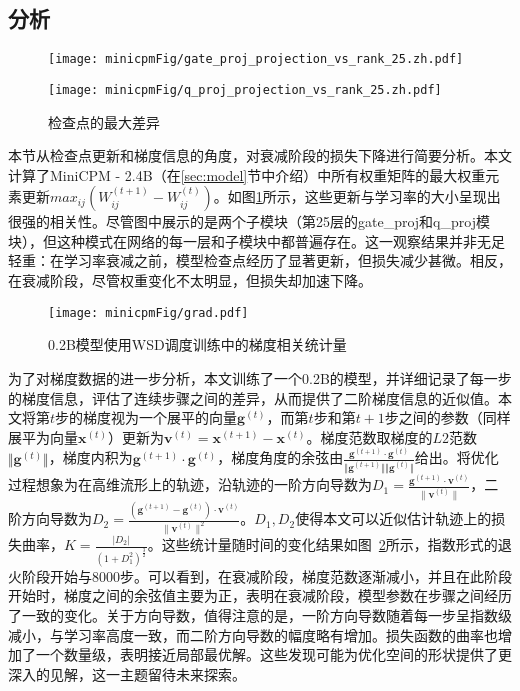 \subsection{分析}
\begin{figure}[htbp]
    \centering
    \begin{minipage}[b]{0.8\linewidth}
        \centering
        \texttt{[image: minicpmFig/gate\_proj\_projection\_vs\_rank\_25.zh.pdf]}
    \end{minipage}
    \vspace{0.5cm} %
    \begin{minipage}[b]{0.8\linewidth}
        \centering
        \texttt{[image: minicpmFig/q\_proj\_projection\_vs\_rank\_25.zh.pdf]}
    \end{minipage}
    \caption{检查点的最大差异}
    \label{fig:appmaxdiff}
\end{figure}
本节从检查点更新和梯度信息的角度，对衰减阶段的损失下降进行简要分析。本文计算了MiniCPM - 2.4B（在\ref{sec:model}节中介绍）中所有权重矩阵的最大权重元素更新$max_{ij} (W_{ij}^{(t + 1)} - W_{ij}^{(t)})$。如图\ref{fig:appmaxdiff}所示，这些更新与学习率的大小呈现出很强的相关性。尽管图中展示的是两个子模块（第25层的gate\_proj和q\_proj模块），但这种模式在网络的每一层和子模块中都普遍存在。这一观察结果并非无足轻重：在学习率衰减之前，模型检查点经历了显著更新，但损失减少甚微。相反，在衰减阶段，尽管权重变化不太明显，但损失却加速下降。  




\begin{figure}[htbp]
    \centering
        \centering
        \texttt{[image: minicpmFig/grad.pdf]}
     \caption{0.2B模型使用WSD调度训练中的梯度相关统计量}
        \label{fig:grad}
\end{figure}

为了对梯度数据的进一步分析，本文训练了一个0.2B的模型，并详细记录了每一步的梯度信息，评估了连续步骤之间的差异，从而提供了二阶梯度信息的近似值。本文将第$t$步的梯度视为一个展平的向量$\mathbf{g}^{(t)}$，而第$t$步和第$t+1$步之间的参数（同样展平为向量$\mathbf{x}^{(t)}$）更新为$\mathbf{v}^{(t)} = \mathbf{x}^{(t+1)} - \mathbf{x}^{(t)}$。梯度范数取梯度的$L2$范数$\Vert\mathbf{g}^{(t)} \Vert$，梯度内积为$\mathbf{g}^{(t+1)} \cdot \mathbf{g}^{(t)}$，梯度角度的余弦由$\frac{\mathbf{g}^{(t+1)} \cdot \mathbf{g}^{(t)}}  {\Vert\mathbf{g}^{(t+1)} \Vert \Vert\mathbf{g}^{(t)} \Vert}$给出。将优化过程想象为在高维流形上的轨迹，沿轨迹的一阶方向导数为$D_1 = \frac{\mathbf{g}^{(t+1)} \cdot \mathbf{v}^{(t)}}{\|\mathbf{v}^{(t)}\|}
$，二阶方向导数为$D_2 = \frac{(\mathbf{g}^{(t+1)} - \mathbf{g}^{(t)}) \cdot \mathbf{v}^{(t)}}{\|\mathbf{v}^{(t)}\|^2}
$。$D_1, D_2$使得本文可以近似估计轨迹上的损失曲率，$K = \frac{|D_2|}{(1 + D_1^2)^{\frac{3}{2}}}$。这些统计量随时间的变化结果如图~\ref{fig:grad}所示，指数形式的退火阶段开始与8000步。可以看到，在衰减阶段，梯度范数逐渐减小，并且在此阶段开始时，梯度之间的余弦值主要为正，表明在衰减阶段，模型参数在步骤之间经历了一致的变化。关于方向导数，值得注意的是，一阶方向导数随着每一步呈指数级减小，与学习率高度一致，而二阶方向导数的幅度略有增加。损失函数的曲率也增加了一个数量级，表明接近局部最优解。这些发现可能为优化空间的形状提供了更深入的见解，这一主题留待未来探索。

